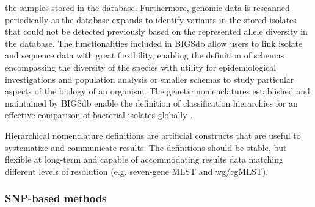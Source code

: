 the samples stored in the database. Furthermore, genomic data is rescanned periodically as the database expands to identify variants in the stored isolates that could not be detected previously based on the represented allele diversity in the database. The functionalities included in \ac{BIGSdb} allow users to link isolate and sequence data with great flexibility, enabling the definition of schemas encompassing the diversity of the species with utility for epidemiological investigations and population analysis or smaller schemas to study particular aspects of the biology of an organism. The genetic nomenclatures established and maintained by \ac{BIGSdb} enable the definition of classification hierarchies for an effective comparison of bacterial isolates globally \cite{jolley_open-access_2018}.

Hierarchical nomenclature definitions are artificial constructs that are useful to systematize and communicate results. The definitions should be stable, but flexible at long-term and capable of accommodating results data matching different levels of resolution (e.g. seven-gene MLST and wg/cgMLST).

\subsubsection{SNP-based methods}

